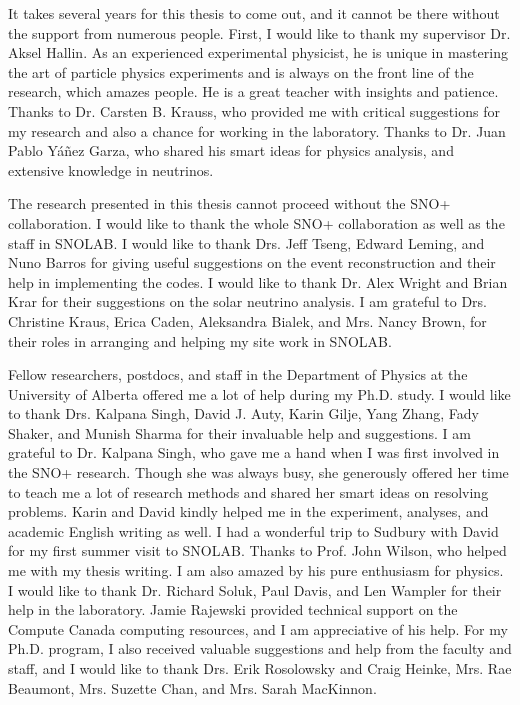It takes several years for this thesis to come out, and it cannot be there without the support from numerous people. First, I would like to thank my supervisor Dr. Aksel Hallin. As an experienced experimental physicist, he is unique in mastering the art of particle physics experiments and is always on the front line of the research, which amazes people. He is a great teacher with insights and patience. Thanks to Dr. Carsten B. Krauss, who provided me with critical suggestions for my research and also a chance for working in the laboratory. Thanks to Dr. Juan Pablo Y\'{a}\~{n}ez Garza, who shared his smart ideas for physics analysis, and extensive knowledge in neutrinos.

The research presented in this thesis cannot proceed without the SNO+ collaboration. I would like to thank the whole SNO+ collaboration as well as the staff in SNOLAB. I would like to thank Drs. Jeff Tseng, Edward Leming, and Nuno Barros for giving useful suggestions on the event reconstruction and their help in implementing the codes. I would like to thank Dr. Alex Wright and Brian Krar for their suggestions on the solar neutrino analysis. I am grateful to Drs. Christine Kraus, Erica Caden, Aleksandra Bialek, and Mrs. Nancy Brown, for their roles in arranging and helping my site work in SNOLAB.

Fellow researchers, postdocs, and staff in the Department of Physics at the University of Alberta offered me a lot of help during my Ph.D. study. I would like to thank Drs. Kalpana Singh, David J. Auty, Karin Gilje, Yang Zhang, Fady Shaker, and Munish Sharma for their invaluable help and suggestions. I am grateful to Dr. Kalpana Singh, who gave me a hand when I was first involved in the SNO+ research. Though she was always busy, she generously offered her time to teach me a lot of research methods and shared her smart ideas on resolving problems. Karin and David kindly helped me in the experiment, analyses, and academic English writing as well. I had a wonderful trip to Sudbury with David for my first summer visit to SNOLAB. Thanks to Prof. John Wilson, who helped me with my thesis writing. I am also amazed by his pure enthusiasm for physics. I would like to thank Dr. Richard Soluk, Paul Davis, and Len Wampler for their help in the laboratory. Jamie Rajewski provided technical support on the Compute Canada computing resources, and I am appreciative of his help. For my Ph.D. program, I also received valuable suggestions and help from the faculty and staff, and I would like to thank Drs. Erik Rosolowsky and Craig Heinke, Mrs. Rae Beaumont, Mrs. Suzette Chan, and Mrs. Sarah MacKinnon.


